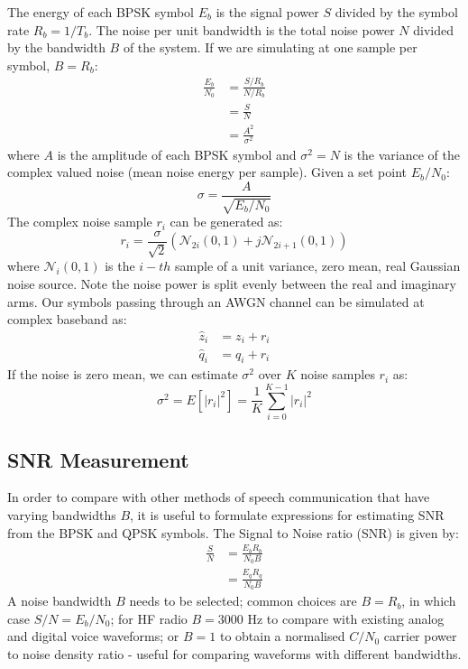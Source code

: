\documentclass{article}
\begin{document}
The energy of each BPSK symbol $E_b$ is the signal power $S$ divided by the symbol rate $R_b=1/T_b$.  The noise per unit bandwidth is the total noise power $N$ divided by the bandwidth $B$ of the system.  If we are simulating at one sample per symbol, $B=R_b$:
\begin{equation}
\begin{split}
\frac{E_b}{N_0} &= \frac{S/R_b}{N/R_b} \\
                &= \frac{S}{N} \\
                &= \frac{A^2}{\sigma^2}
\end{split}
\end{equation}
where $A$ is the amplitude of each BPSK symbol and $\sigma^2=N$ is the variance of the complex valued noise (mean noise energy per sample).  Given a set point $E_b/N_0$:
\begin{equation}
\label{eq:noise_sigma}
\sigma = \frac{A}{\sqrt{E_b/N_0}}
\end{equation}
The complex noise sample $r_i$ can be generated as:
\begin{equation}
r_i = \frac{\sigma}{\sqrt{2}}(\mathcal{N}_{2i}(0,1) + j\mathcal{N}_{2i+1}(0,1))
\end{equation}
where $\mathcal{N}_i(0,1)$ is the $i-th$ sample of a unit variance, zero mean, real Gaussian noise source.  Note the noise power is split evenly between the real and imaginary arms. Our symbols passing through an AWGN channel can be simulated at complex baseband as:
\begin{equation}
\begin{split}
\hat{z}_i &= z_i + r_i \\
\hat{q}_i &= q_i + r_i
\end{split}
\end{equation}
If the noise is zero mean, we can estimate $\sigma^2$ over $K$ noise samples $r_i$ as:
\begin{equation}
\sigma^2 = E[|r_i|^2] = \frac{1}{K}\sum_{i=0}^{K-1}|r_i|^2 
\end{equation}

\subsection{SNR Measurement}

In order to compare with other methods of speech communication that have varying bandwidths $B$, it is useful to formulate expressions for estimating SNR from the BPSK and QPSK symbols.  The Signal to Noise ratio (SNR) is given by:
\begin{equation}
\label{eq:snr_theory}
\begin{split}
\frac{S}{N} &= \frac{E_bR_b}{N_0B} \\
            &= \frac{E_qR_q}{N_0B}
\end{split}
\end{equation}
A noise bandwidth $B$ needs to be selected; common choices are $B=R_b$, in which case $S/N=E_b/N_0$; for HF radio $B=3000$ Hz to compare with existing analog and digital voice waveforms; or $B=1$ to obtain a normalised $C/N_0$ carrier power to noise density ratio - useful for comparing waveforms with different bandwidths.
 
\end{document}
